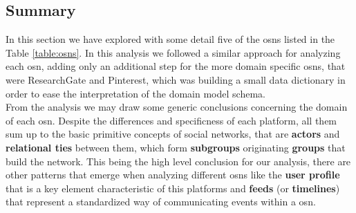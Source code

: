 \subsection{Summary}
In this section we have explored with some detail five of the \glspl{osn} listed in the Table \ref{table:osns}. In this analysis we followed a similar approach for analyzing each \gls{osn}, adding only an additional step for the more domain specific \glspl{osn}, that were ResearchGate and Pinterest, which was building a small data dictionary in order to ease the interpretation of the domain model schema.\\
\indent From the analysis we may draw some generic conclusions concerning the domain of each \gls{osn}. Despite the differences and specificness of each platform, all them sum up to the basic primitive concepts of social networks, that are \textbf{actors} and \textbf{relational ties} between them, which form \textbf{subgroups} originating \textbf{groups} that build the network. This being the high level conclusion for our analysis, there are other patterns that emerge when analyzing different \glspl{osn} like the \textbf{user profile} that is a key element characteristic of this platforms and \textbf{feeds} (or \textbf{timelines}) that represent a standardized way of communicating events within a \gls{osn}.
